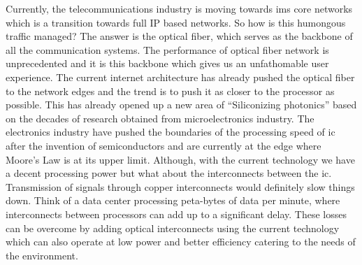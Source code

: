 \documentclass[../report.tex]{subfiles}
\begin{document}
Currently, the telecommunications industry is moving towards \gls{ims} core networks which is a transition towards full IP based networks. So how is this humongous traffic managed? The answer is the optical fiber, which serves as the backbone of all the communication systems. The performance of optical fiber network is unprecedented and it is this backbone which gives us an unfathomable user experience. The current internet architecture has already pushed the optical fiber to the network edges and the trend is to push it as closer to the processor as possible. This has already opened up a new area of “Siliconizing photonics” based on the decades of research obtained from microelectronics industry. The electronics industry have pushed the boundaries of the processing speed of \gls{ic} after the invention of semiconductors and are currently at the edge where Moore’s Law is at its upper limit. Although, with the current technology we have a decent processing power but what about the interconnects between the \gls{ic}. Transmission of signals through copper interconnects would definitely slow things down. Think of a data center processing peta-bytes of data per minute, where interconnects between processors can add up to a significant delay. These losses can be overcome by adding optical interconnects using the current technology which can also operate at low power and better efficiency catering to the needs of the environment.
	
\end{document}
